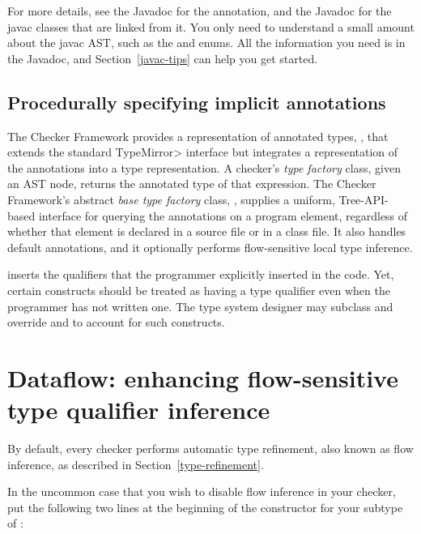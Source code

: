 For more details, see the Javadoc for the 
  annotation, and the Javadoc for the javac classes that are linked from
it.  You only need to understand a small amount about the javac AST, such
as the
\href{\TreeAPIBase{}/tree/Tree.Kind.html?is-external=true}{}
and
enums.  All the information you need is in the Javadoc, and
Section~\ref{javac-tips} can help you get started.


\subsection{Procedurally specifying implicit annotations\label{procedurally-specifying-implicit-annotations}}


The Checker Framework provides a representation of annotated types,
, that extends the standard \<TypeMirror>
interface but integrates a representation of the annotations into a
type representation.  A checker's \emph{type factory} class, given an AST
node, returns the annotated type of that expression.  The Checker
Framework's abstract
\emph{base type factory} class, ,
supplies a uniform, Tree-API-based interface
for querying the annotations on a program element, regardless of
whether that element is declared in a source file or in a class file.
It also handles default annotations, and it optionally performs
flow-sensitive local type inference.

 inserts the qualifiers that the programmer
explicitly inserted in the code.  Yet, certain constructs should be
treated as having a type qualifier even when the programmer has not
written one.  The type system designer may subclass
 and override
 and
 to account for
such constructs.


\section{Dataflow: enhancing flow-sensitive type qualifier inference\label{dataflow}}

By default, every checker performs automatic type refinement, also known as
flow inference, as described
in Section~\ref{type-refinement}.

In the uncommon case that you wish to disable flow inference in your
checker, put the following two lines at the beginning of the constructor
for your subtype of
:

